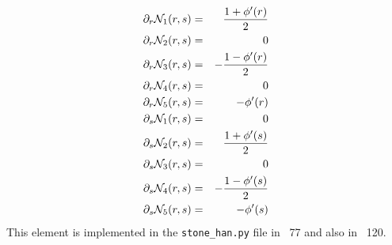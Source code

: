 \begin{eqnarray}
\partial_r {\mathcal{N}}_1(r,s) &=& \frac{1 + \phi'(r)}{2} \nonumber\\
\partial_r {\mathcal{N}}_2(r,s) &=& 0 \nonumber\\
\partial_r {\mathcal{N}}_3(r,s) &=& -\frac{1-\phi'(r)}{2} \nonumber\\
\partial_r {\mathcal{N}}_4(r,s) &=& 0 \nonumber\\
\partial_r {\mathcal{N}}_5(r,s) &=& -\phi'(r) \nonumber\\
\partial_s {\mathcal{N}}_1(r,s) &=& 0 \nonumber\\
\partial_s {\mathcal{N}}_2(r,s) &=& \frac{1 + \phi'(s)}{2} \nonumber\\
\partial_s {\mathcal{N}}_3(r,s) &=&  0 \nonumber\\
\partial_s {\mathcal{N}}_4(r,s) &=& -\frac{1-\phi'(s)}{2} \nonumber\\
\partial_s {\mathcal{N}}_5(r,s) &=& -\phi'(s) \nonumber
\end{eqnarray}
This element is implemented in the {\tt stone\_han.py} file in \stone~77 and also in \stone~120. 






